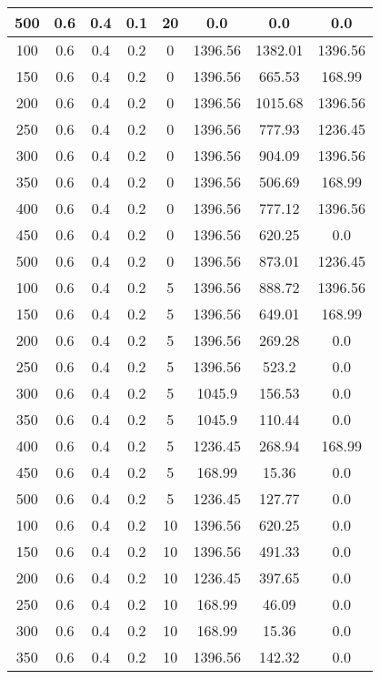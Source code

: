 \documentclass[a4paper, 12pt]{extreport}
\begin{document}
\begin{itemize}
\begin{longtable}{|c|c|c|c|c|c|c|c|}
			500 & 0.6 & 0.4 & 0.1 & 20 & 0.0 & 0.0 & 0.0 \\\hline
			100 & 0.6 & 0.4 & 0.2 & 0 & 1396.56 & 1382.01 & 1396.56 \\\hline
			150 & 0.6 & 0.4 & 0.2 & 0 & 1396.56 & 665.53 & 168.99 \\\hline
			200 & 0.6 & 0.4 & 0.2 & 0 & 1396.56 & 1015.68 & 1396.56 \\\hline
			250 & 0.6 & 0.4 & 0.2 & 0 & 1396.56 & 777.93 & 1236.45 \\\hline
			300 & 0.6 & 0.4 & 0.2 & 0 & 1396.56 & 904.09 & 1396.56 \\\hline
			350 & 0.6 & 0.4 & 0.2 & 0 & 1396.56 & 506.69 & 168.99 \\\hline
			400 & 0.6 & 0.4 & 0.2 & 0 & 1396.56 & 777.12 & 1396.56 \\\hline
			450 & 0.6 & 0.4 & 0.2 & 0 & 1396.56 & 620.25 & 0.0 \\\hline
			500 & 0.6 & 0.4 & 0.2 & 0 & 1396.56 & 873.01 & 1236.45 \\\hline
			100 & 0.6 & 0.4 & 0.2 & 5 & 1396.56 & 888.72 & 1396.56 \\\hline
			150 & 0.6 & 0.4 & 0.2 & 5 & 1396.56 & 649.01 & 168.99 \\\hline
			200 & 0.6 & 0.4 & 0.2 & 5 & 1396.56 & 269.28 & 0.0 \\\hline
			250 & 0.6 & 0.4 & 0.2 & 5 & 1396.56 & 523.2 & 0.0 \\\hline
			300 & 0.6 & 0.4 & 0.2 & 5 & 1045.9 & 156.53 & 0.0 \\\hline
			350 & 0.6 & 0.4 & 0.2 & 5 & 1045.9 & 110.44 & 0.0 \\\hline
			400 & 0.6 & 0.4 & 0.2 & 5 & 1236.45 & 268.94 & 168.99 \\\hline
			450 & 0.6 & 0.4 & 0.2 & 5 & 168.99 & 15.36 & 0.0 \\\hline
			500 & 0.6 & 0.4 & 0.2 & 5 & 1236.45 & 127.77 & 0.0 \\\hline
			100 & 0.6 & 0.4 & 0.2 & 10 & 1396.56 & 620.25 & 0.0 \\\hline
			150 & 0.6 & 0.4 & 0.2 & 10 & 1396.56 & 491.33 & 0.0 \\\hline
			200 & 0.6 & 0.4 & 0.2 & 10 & 1236.45 & 397.65 & 0.0 \\\hline
			250 & 0.6 & 0.4 & 0.2 & 10 & 168.99 & 46.09 & 0.0 \\\hline
			300 & 0.6 & 0.4 & 0.2 & 10 & 168.99 & 15.36 & 0.0 \\\hline
			350 & 0.6 & 0.4 & 0.2 & 10 & 1396.56 & 142.32 & 0.0 \\\hline

\end{longtable}
\end{itemize}
\end{document}

